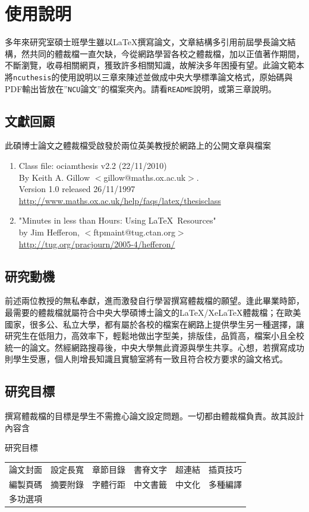 \chapter{使用說明}
多年來研究室碩士班學生雖以\LaTeX 撰寫論文，文章結構多引用前屆學長論文結構，然共同的體裁檔一直欠缺，今從網路學習各校之體裁檔，加以正值著作期間，不斷瀏覽，收尋相關網頁，獲致許多相關知識，故解決多年困擾有望。此論文範本將{\tt ncuthesis}的使用說明以三章來陳述並做成中央大學標準論文格式，原始碼與PDF輸出皆放在''{\tt NCU}論文''的檔案夾內。請看{\tt README}說明，或第三章說明。
\section{文獻回顧}
此碩博士論文之體裁檔受啟發於兩位英美教授於網路上的公開文章與檔案
\begin{enumerate}
\item Class file: ociamthesis v2.2 (22/11/2010) \\
    By Keith A. Gillow $<$gillow@maths.ox.ac.uk$>$. \\
    Version 1.0 released 26/11/1997\\
	\url{http://www.maths.ox.ac.uk/help/faqs/latex/thesisclass}
\item "Minutes in less than Hours: Using \LaTeX\ Resources" \\
    by Jim Hefferon, $<$ftpmaint@tug.ctan.org$>$\\
	\url{http://tug.org/pracjourn/2005-4/hefferon/}
\end{enumerate}
\section{研究動機}
前述兩位教授的無私奉獻，進而激發自行學習撰寫體裁檔的願望。逢此畢業時節，最需要的體裁檔就屬符合中央大學碩博士論文的\LaTeX{}/Xe\LaTeX{}體裁檔；在歐美國家，很多公、私立大學，都有屬於各校的檔案在網路上提供學生另一種選擇，讓研究生在低阻力，高效率下，輕鬆地做出字型美，排版佳，品質高，檔案小且全校統一的論文。然經網路搜尋後，中央大學無此資源與學生共享。心想，若撰寫成功則學生受惠，個人則增長知識且實驗室將有一致且符合校方要求的論文格式。

\section{研究目標}
撰寫體裁檔的目標是學生不需擔心論文設定問題。一切都由體裁檔負責。故其設計內容含 \par
\begin{table}[!hbt]
\centering             {}
\caption{研究目標}
\end{table}
\begin{tabular}{cccccc}\\
論文封面 & 設定長寬 & 章節目錄 & 書脊文字 & 超連結 & 插頁技巧\\ 
編製頁碼 & 摘要附錄 & 字體行距 & 中文書籤 & 中文化 & 多種編譯  \\
多功選項 & \\
\end{tabular}\\

